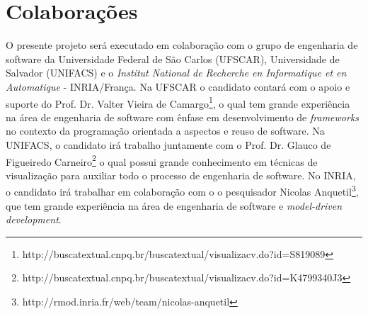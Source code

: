 \documentclass[12pt]{article}
\begin{document}
\section{Colaborações}\label{sec:colaboracoes}

O presente projeto será executado em colaboração com o grupo de engenharia de software da
Universidade Federal de São Carlos (UFSCAR), Universidade de Salvador (UNIFACS) e o \textit{Institut National de Recherche en Informatique et en Automatique} - INRIA/França. Na UFSCAR o candidato contará com o apoio e suporte do Prof. Dr. Valter Vieira de Camargo\footnote{http://buscatextual.cnpq.br/buscatextual/visualizacv.do?id=S819089}, o qual tem grande experiência na área de engenharia de software com ênfase em desenvolvimento de \textit{frameworks} no contexto da programação orientada a aspectos e reuso de software. Na UNIFACS, o candidato irá trabalho juntamente com o Prof. Dr. Glauco de Figueiredo Carneiro\footnote{http://buscatextual.cnpq.br/buscatextual/visualizacv.do?id=K4799340J3} o qual possui grande conhecimento em técnicas de visualização para auxiliar todo o processo de engenharia de software. No INRIA, o candidato irá trabalhar em colaboração com o o pesquisador Nicolas Anquetil\footnote{http://rmod.inria.fr/web/team/nicolas-anquetil}, que tem grande experiência na área de engenharia de software e \textit{model-driven development}.




\end{document}
